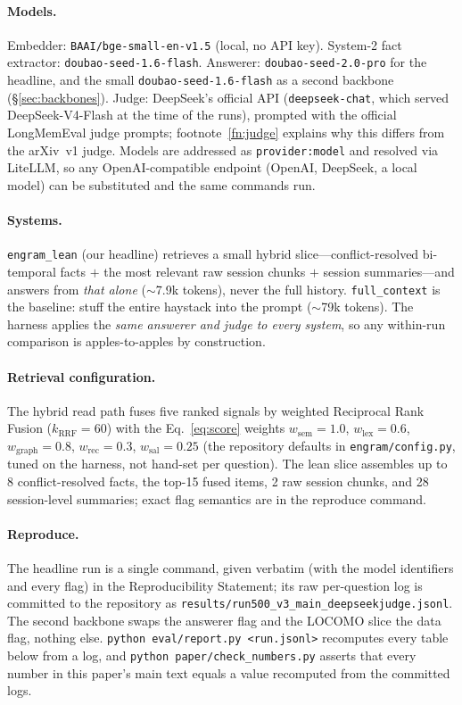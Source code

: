 \documentclass{article}
\newcommand{\lean}{\texttt{engram\_lean}}
\newcommand{\full}{\texttt{full\_context}}
\begin{document}
\paragraph{Models.}
Embedder: \texttt{BAAI/bge-small-en-v1.5} (local, no API key). System-2 fact extractor:
\texttt{doubao-seed-1.6-flash}. Answerer: \texttt{doubao-seed-2.0-pro} for the headline, and the small
\texttt{doubao-seed-1.6-flash} as a second backbone (\S\ref{sec:backbones}). Judge: DeepSeek's official API
(\texttt{deepseek-chat}, which served DeepSeek-V4-Flash at the time of the runs), prompted with the official
LongMemEval judge prompts; footnote~\ref{fn:judge} explains why this differs from the arXiv~v1 judge. Models
are addressed as \texttt{provider:model} and resolved via LiteLLM, so any OpenAI-compatible endpoint (OpenAI,
DeepSeek, a local model) can be substituted and the same commands run.

\paragraph{Systems.}
\lean{} (our headline) retrieves a small hybrid slice---conflict-resolved bi-temporal facts $+$ the most
relevant raw session chunks $+$ session summaries---and answers from \emph{that alone} ($\sim$7.9k tokens),
never the full history. \full{} is the baseline: stuff the entire haystack into the prompt ($\sim$79k tokens).
The harness applies the \emph{same answerer and judge to every system}, so any within-run comparison is
apples-to-apples by construction.

\paragraph{Retrieval configuration.}
The hybrid read path fuses five ranked signals by weighted Reciprocal Rank Fusion ($k_{\text{RRF}}=60$) with
the Eq.~\eqref{eq:score} weights $w_{\text{sem}}=1.0$, $w_{\text{lex}}=0.6$, $w_{\text{graph}}=0.8$,
$w_{\text{rec}}=0.3$, $w_{\text{sal}}=0.25$ (the repository defaults in \texttt{engram/config.py}, tuned on
the harness, not hand-set per question). The lean slice assembles up to 8 conflict-resolved facts, the
top-15 fused items, 2 raw session chunks, and 28 session-level summaries; exact flag semantics are in the
reproduce command.

\paragraph{Reproduce.}
The headline run is a single command, given verbatim (with the model identifiers and every flag) in the
Reproducibility Statement; its raw per-question log is committed to the repository as
\texttt{results/run500\_v3\_main\_deepseekjudge.jsonl}. The second backbone swaps the answerer flag and the
LOCOMO slice the data flag, nothing else. \texttt{python eval/report.py <run.jsonl>} recomputes every table
below from a log, and \texttt{python paper/check\_numbers.py} asserts that every number in this paper's
main text equals a value recomputed from the committed logs.
\end{document}
